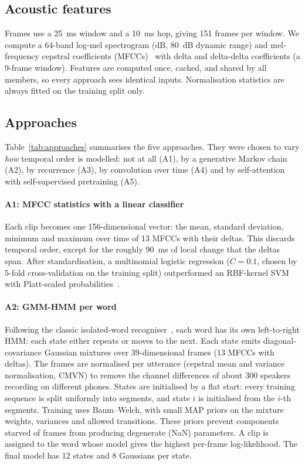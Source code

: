 \subsection{Acoustic features}
Frames use a 25~ms window and a 10~ms hop, giving 151 frames per window. We compute a 64-band log-mel spectrogram
(dB, 80~dB dynamic range) and mel-frequency cepstral coefficients (MFCCs)~\cite{davis1980comparison} with delta and
delta-delta coefficients (a 9-frame window). Features are computed once, cached, and shared by all members, so every
approach sees identical inputs. Normalisation statistics are always fitted on the training split only.

\subsection{Approaches}
Table~\ref{tab:approaches} summarises the five approaches. They were chosen to vary \emph{how} temporal order is
modelled: not at all (A1), by a generative Markov chain (A2), by recurrence (A3), by convolution over time (A4) and
by self-attention with self-supervised pretraining (A5).

\paragraph{A1: MFCC statistics with a linear classifier}
Each clip becomes one 156-dimensional vector: the mean, standard deviation, minimum and maximum over time of 13
MFCCs with their deltas. This discards temporal order, except for the roughly 90~ms of local change that the deltas
span. After standardisation, a multinomial logistic
regression ($C=0.1$, chosen by 5-fold cross-validation on the training split) outperformed an RBF-kernel SVM with
Platt-scaled probabilities~\cite{platt1999probabilistic,wu2004probability}.

\paragraph{A2: GMM-HMM per word}
Following the classic isolated-word recogniser~\cite{rabiner1989tutorial}, each word has its own left-to-right HMM:
each state either repeats or moves to the next. Each state emits diagonal-covariance Gaussian mixtures over
39-dimensional frames (13 MFCCs with deltas). The frames are normalised per utterance (cepstral mean and variance
normalisation, CMVN) to remove the channel differences of about 300 speakers recording on different phones. States
are initialised by a flat start: every training sequence is split uniformly into segments, and state $i$ is
initialised from the $i$-th segments. Training uses Baum--Welch, with small MAP priors on the mixture weights,
variances and allowed transitions. These priors prevent components starved of frames from producing degenerate
(NaN) parameters. A clip is assigned to the word whose model gives the highest per-frame log-likelihood. The final
model has 12 states and 8 Gaussians per state.

